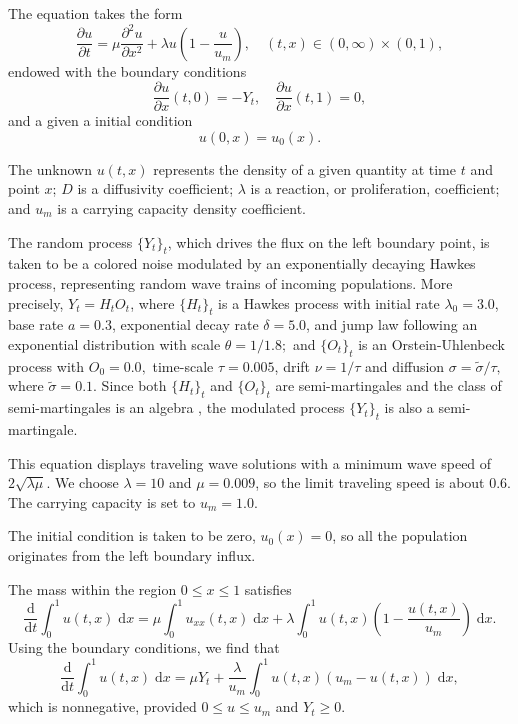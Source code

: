 \documentclass[reqno,12pt]{amsart}
\theoremstyle{plain} %
\theoremstyle{definition} %
\begin{document}
The equation takes the form
\begin{equation}
    \label{fisherkpprode}
    \frac{\partial u}{\displaystyle \partial t} = \mu\frac{\partial^2 u}{\partial x^2} + \lambda u\left(1 - \frac{u}{u_m}\right), \quad (t, x) \in (0, \infty) \times (0, 1),
\end{equation}
endowed with the boundary conditions
\begin{equation}
    \label{fisherkppbc}
    \frac{\partial u}{\partial x}(t, 0) = - Y_t, \quad \frac{\partial u}{\partial x}(t, 1) = 0,
\end{equation}
and a given a initial condition
\[
   u(0, x) = u_0(x).
\]

The unknown $u(t, x)$ represents the density of a given quantity at time $t$ and point $x$; $D$ is a diffusivity coefficient; $\lambda$ is a reaction, or proliferation, coefficient; and $u_m$ is a carrying capacity density coefficient.

The random process $\{Y_t\}_t$, which drives the flux on the left boundary point, is taken to be a colored noise modulated by an exponentially decaying Hawkes process, representing random wave trains of incoming populations. More precisely, $Y_t = H_t O_t$, where $\{H_t\}_t$ is a Hawkes process with initial rate $\lambda_0 = 3.0$, base rate $a = 0.3$, exponential decay rate $\delta = 5.0$, and jump law following an exponential distribution with scale $\theta = 1/1.8;$ and $\{O_t\}_t$ is an Orstein-Uhlenbeck process with $O_0 = 0.0,$ time-scale $\tau = 0.005$, drift $\nu = 1/\tau$ and diffusion $\sigma = \tilde \sigma/\tau,$ where $\tilde\sigma = 0.1.$ Since both $\{H_t\}_t$ and $\{O_t\}_t$ are semi-martingales and the class of semi-martingales is an algebra \cite[Corollary II.3]{Protter2005}, the modulated process $\{Y_t\}_t$ is also a semi-martingale.

This equation displays traveling wave solutions with a minimum wave speed of $2 \sqrt{\lambda \mu}$. We choose $\lambda = 10$ and $\mu= 0.009$, so the limit traveling speed is about $0.6$. The carrying capacity is set to $u_m = 1.0$.

The initial condition is taken to be zero, $u_0(x) = 0$, so all the population originates from the left boundary influx.

The mass within the region $0\leq x \leq 1$ satisfies
\[
   \frac{\mathrm{d}}{\mathrm{d} t} \int_0^1 u(t, x) \;\mathrm{d}x = \mu\int_0^1 u_{xx}(t, x) \;\mathrm{d}x + \lambda \int_0^1 u(t, x)\left(1 - \frac{u(t, x)}{u_m}\right)\;\mathrm{d}x.
\]
Using the boundary conditions, we find that
\[
   \frac{\mathrm{d}}{\mathrm{d}t} \int_0^1 u(t, x) \;\mathrm{d}x = \mu Y_t  + \frac{\lambda}{u_m} \int_0^1 u(t, x)\left(u_m - u(t, x)\right)\;\mathrm{d}x,
\]
which is nonnegative, provided $0 \leq u \leq u_m$ and $Y_t \geq 0$.
\end{document}
